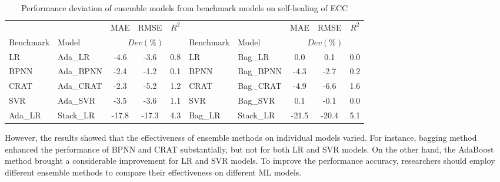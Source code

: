 \documentclass[11pt]{article}
\begin{document}
	
	\begin{table}[!h]
		\small
		\centering
		\caption{Performance deviation of ensemble models from benchmark models on self-healing of ECC }
		\begin{tabular*}{0.9\textwidth}{llccc|llccc}
			\toprule
			&	&	MAE	&	RMSE	&	$R^2$	&	&	&	MAE	&	RMSE	&	$R^2$	\\
			\cmidrule{3-5} \cmidrule{8-10}
			Benchmark & Model& \multicolumn{3}{c|}{$Dev (\%)$} &Benchmark & Model& \multicolumn{3}{c}{$Dev (\%)$} \\
			\midrule
			LR	&	Ada\_LR	&	-4.6	&	-3.6	&	0.8		&	LR	&	Bag\_LR	&	0.0	&	0.1	&	0.0	\\
			BPNN	&	Ada\_BPNN	&	-2.4	&	-1.2	&	0.1	&	BPNN	&	Bag\_BPNN	&	-4.3	&	-2.7	&	0.2	\\
			CRAT	&	Ada\_CRAT	&-2.3	&	-5.2	&	1.2	&	CRAT	&	Bag\_CRAT	&	-4.9	&	-6.6	&	1.6\\
			SVR	&	Ada\_SVR&-3.5	&	-3.6&	1.1	&	SVR	&	Bag\_SVR	&	0.1	&	-0.1	&	0.0	\\
			\midrule
			Ada\_LR	&	Stack\_LR	&	-17.8&	-17.3&	4.3	&	Bag\_LR	&	Stack\_LR	&-21.5	&	-20.4&	5.1 \\
			\bottomrule 
		\end{tabular*}
		\label{com}
	\end{table} 
	
		However, the results showed that the effectiveness of ensemble methods on individual models varied. For instance, bagging method enhanced the performance of BPNN and CRAT substantially, but not for both LR and SVR models. On the other hand, the AdaBoost method brought a considerable improvement for LR and SVR models. To improve the performance accuracy, researchers should employ different ensemble methods to compare their effectiveness on different ML models.  
	
\end{document}
